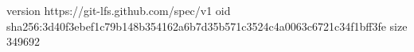 version https://git-lfs.github.com/spec/v1
oid sha256:3d40f3ebef1c79b148b354162a6b7d35b571c3524c4a0063c6721c34f1bff3fe
size 349692
